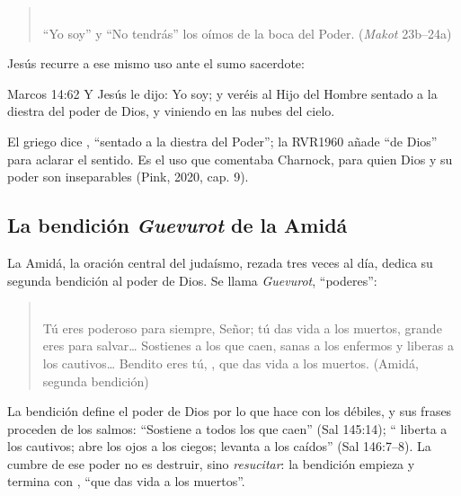 \begin{quote}\small
{}\\
``Yo soy'' y ``No tendrás'' los oímos de la boca del Poder. (\emph{Makot} 23b--24a)
\end{quote}

Jesús recurre a ese mismo uso ante el sumo sacerdote:

\begin{verso}{Marcos 14:62}
Y Jesús le dijo: Yo soy; y veréis al Hijo del Hombre sentado a la diestra del poder de Dios, y viniendo en las nubes del cielo.
\end{verso}

El griego dice , ``sentado a la diestra del Poder''; la RVR1960 añade ``de Dios'' para aclarar el sentido. Es el uso que comentaba Charnock, para quien Dios y su poder son inseparables (Pink, 2020, cap. 9).


\subsection{La bendición \emph{Guevurot} de la Amidá}

La Amidá, la oración central del judaísmo, rezada tres veces al día, dedica su segunda bendición al poder de Dios. Se llama \emph{Guevurot}, ``poderes'':

\begin{quote}\small
{}\\
Tú eres poderoso para siempre, Señor; tú das vida a los muertos, grande eres para salvar\ldots{} Sostienes a los que caen, sanas a los enfermos y liberas a los cautivos\ldots{} Bendito eres tú, \SENOR, que das vida a los muertos. (Amidá, segunda bendición)
\end{quote}

La bendición define el poder de Dios por lo que hace con los débiles, y sus frases proceden de los salmos: ``Sostiene \SENOR{} a todos los que caen'' (Sal 145:14); ``\SENOR{} liberta a los cautivos; \SENOR{} abre los ojos a los ciegos; \SENOR{} levanta a los caídos'' (Sal 146:7--8). La cumbre de ese poder no es destruir, sino \emph{resucitar}: la bendición empieza y termina con , ``que das vida a los muertos''.

